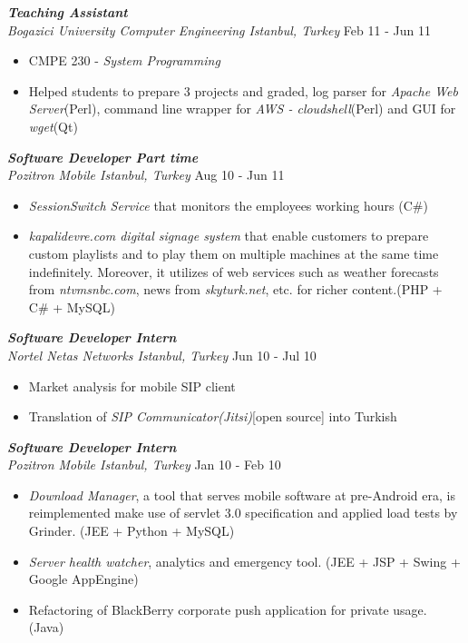 \documentclass[line, margin]{res}
\begin{document}
\begin{resume}
				{\sl \textbf{Teaching Assistant} \\ Bogazici University Computer Engineering Istanbul, Turkey} \hfill Feb 11 - Jun 11 \\
				\vspace{-.3cm} 
				\begin{itemize} \itemsep -2pt
					\item CMPE 230 - \textit{System Programming}
					\item Helped students to prepare 3 projects and graded, log parser for \textit{Apache Web Server}(Perl), command line wrapper for \textit{AWS - cloudshell}(Perl) and GUI for \textit{wget}(Qt)
				\end{itemize}

				{\sl \textbf{Software Developer Part time} \\ Pozitron Mobile Istanbul, Turkey} \hfill Aug 10 - Jun 11 \\
				\vspace{-0.3cm}
				\begin{itemize} \itemsep -2pt
					\item \textit{SessionSwitch Service} that monitors the employees working hours (C\#) 
					\item \textit{kapalidevre.com digital signage system} that enable customers to prepare custom playlists and to play them on multiple machines at the same time indefinitely. Moreover, it utilizes of web services such as weather forecasts from \textit{ntvmsnbc.com}, news from \textit{skyturk.net}, etc. for richer content.(PHP + C\# + MySQL)
				\end{itemize}

				{\sl \textbf{Software Developer Intern} \\ Nortel Netas Networks Istanbul, Turkey} \hfill Jun 10 - Jul 10 \\
				\vspace{-0.3cm}
				\begin{itemize} \itemsep -2pt
					\item Market analysis for mobile SIP client
					\item Translation of \textit{SIP Communicator(Jitsi)}[open source] into Turkish 
				\end{itemize}

				{\sl \textbf{Software Developer Intern} \\ Pozitron Mobile Istanbul, Turkey} \hfill Jan 10 - Feb 10 \\
				\vspace{-0.3cm}
				\begin{itemize} \itemsep -2pt
					\item \textit{Download Manager}, a tool that serves mobile software at pre-Android era, is reimplemented make use of servlet 3.0 specification and applied load tests by Grinder. (JEE + Python + MySQL)
					\item \textit{Server health watcher}, analytics and emergency tool. (JEE + JSP + Swing + Google AppEngine)
					\item Refactoring of BlackBerry corporate push application for private usage. (Java)
				\end{itemize}							


\end{resume}
\end{document}
